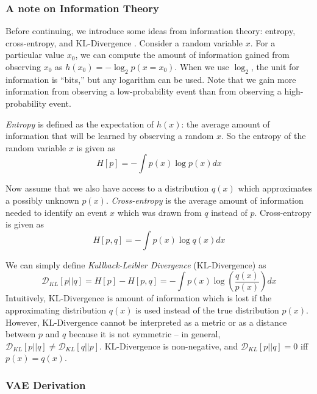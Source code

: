 \subsubsection{A note on Information Theory}
Before continuing, we introduce some ideas from information theory: entropy, cross-entropy, and KL-Divergence \cite{pattern_rec_book}. Consider a random variable $x$. For a particular value $x_0$, we can compute the amount of information gained from observing $x_0$ as $h(x_0) = -\log_2 p(x=x_0)$. When we use $\log_2$, the unit for information is ``bits,'' but any logarithm can be used. Note that we gain more information from observing a low-probability event than from observing a high-probability event. 

\textit{Entropy} is defined as the expectation of $h(x)$: the average amount of information that will be learned by observing a random $x$. So the entropy of the random variable $x$ is given as 
\begin{equation}
  H[p] = - \int p(x) \log p(x)dx
  \label{eq:entropy}
\end{equation}

Now assume that we also have access to a distribution $q(x)$ which approximates a possibly unknown $p(x)$. \textit{Cross-entropy} is the average amount of information needed to identify an event $x$ which was drawn from $q$ instead of $p$. Cross-entropy is given as
\begin{equation}
  H[p,q] = - \int p(x) \log q(x) dx
  \label{eq:xentropy}
\end{equation}

We can simply define \textit{Kullback-Leibler Divergence} (KL-Divergence) \cite{kullback1951} as 
\begin{equation}
  \mathcal{D}_{KL}\left[ p || q \right] = H[p] - H[p,q] = - \int p(x) \log \left(\frac{q(x)}{p(x)} \right)dx
  \label{eq:kl_div}
\end{equation}
Intuitively, KL-Divergence is amount of information which is lost if the approximating distribution $q(x)$ is used instead of the true distribution $p(x)$. However, KL-Divergence cannot be interpreted as a metric or as a distance between $p$ and $q$ because it is not symmetric -- in general, $\mathcal{D}_{KL}[p||q] \not = \mathcal{D}_{KL}[q||p]$. KL-Divergence is non-negative, and $\mathcal{D}_{KL}[p||q] = 0$ iff $p(x) = q(x)$.

\subsubsection{VAE Derivation}\label{sec:vae_derive}

